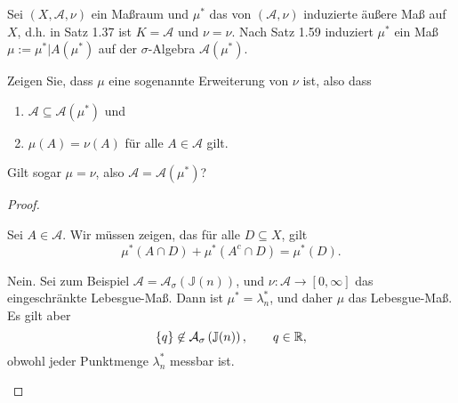 \begin{Problem}
	 Sei $(X, \mathcal{A}, \nu)$ ein Maßraum und $\mu^*$ das von $(\mathcal{A}, \nu)$ induzierte äußere Maß auf $X$, d.h. in Satz 1.37 ist $K = \mathcal{A}$ und $\nu=\nu$. Nach Satz 1.59 induziert $\mu^*$ ein Maß $\mu := \mu^* |A(\mu^*)$ auf der $\sigma$-Algebra $\mathcal{A}(\mu^*)$.
	 \begin{parts}
	 \item Zeigen Sie, dass $\mu$ eine sogenannte Erweiterung von $\nu$ ist, also dass
		 \begin{enumerate}[label=(\arabic*)]
			 \item $\mathcal{A}\subseteq \mathcal{A}(\mu^*)$ und
			 \item $\mu(A)=\nu(A)$ f\"{u}r alle $A\in \mathcal{A}$ gilt.
		 \end{enumerate}
	 \item Gilt sogar $\mu=\nu$, also $\mathcal{A}=\mathcal{A}(\mu^*)$?
	 \end{parts}
\end{Problem}
\begin{proof}
	\begin{parts}
	\item Sei $A\in \mathcal{A}$. Wir müssen zeigen, das f\"{u}r alle $D\subseteq X$, gilt
		\[
			\mu^*(A\cap D)+\mu^*(A^c\cap D)=\mu^*(D)
		.\] 
	\item Nein. Sei zum Beispiel $\mathcal{A}=\mathcal{A}_\sigma\left(\mathbb{J}(n)\right)$, und $\nu:\mathcal{A}\to [0,\infty]$ das eingeschränkte Lebesgue-Maß. Dann ist $\mu^*=\lambda_n^*$, und daher $\mu$ das Lebesgue-Maß. Es gilt aber
		\[
			\left\{ q \right\} \not\in \mathcal{A}_\sigma\left( \mathbb{J}(n) \right), \qquad q\in \mathbb{R}
		,\] 
		obwohl jeder Punktmenge $\lambda_n^*$ messbar ist.
	\end{parts}
\end{proof}
